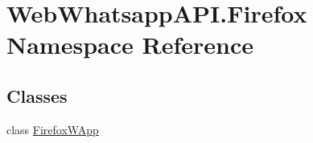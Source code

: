 \hypertarget{namespace_web_whatsapp_a_p_i_1_1_firefox}{}\section{Web\+Whatsapp\+A\+P\+I.\+Firefox Namespace Reference}
\label{namespace_web_whatsapp_a_p_i_1_1_firefox}
\subsection*{Classes}
\begin{DoxyCompactItemize}
\item 
class \hyperlink{class_web_whatsapp_a_p_i_1_1_firefox_1_1_firefox_w_app}{Firefox\+W\+App}
\end{DoxyCompactItemize}

